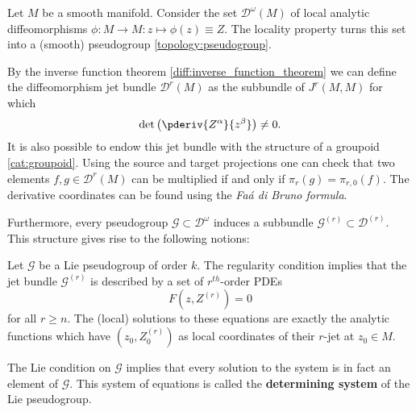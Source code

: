     \begin{example}
        Let $M$ be a smooth manifold. Consider the set $\mathcal{D}^\omega(M)$ of local analytic diffeomorphisms $\phi:M\rightarrow M:z\mapsto\phi(z)\equiv Z$. The locality property turns this set into a (smooth) pseudogroup \ref{topology:pseudogroup}.

        By the inverse function theorem \ref{diff:inverse_function_theorem} we can define the diffeomorphism jet bundle $\mathcal{D}^r(M)$ as the subbundle of $J^r(M,M)$ for which \[\det\left(\pderiv{Z^\alpha}{z^\beta}\right)\neq0.\] It is also possible to endow this jet bundle with the structure of a groupoid \ref{cat:groupoid}. Using the source and target projections one can check that two elements $f,g\in\mathcal{D}^r(M)$ can be multiplied if and only if $\pi_r(g)=\pi_{r,0}(f)$. The derivative coordinates can be found using the \textit{Fa\'a di Bruno formula}.

        Furthermore, every pseudogroup $\mathcal{G}\subset\mathcal{D}^\omega$ induces a subbundle $\mathcal{G}^{(r)}\subset\mathcal{D}^{(r)}$. This structure gives rise to the following notions:
    \end{example}
    \begin{property}
        Let $\mathcal{G}$ be a Lie pseudogroup of order $k$. The regularity condition implies that the jet bundle $\mathcal{G}^{(r)}$ is described by a set of $r^{th}$-order PDEs \[F\left(z, Z^{(r)}\right) = 0\] for all $r\geq n$. The (local) solutions to these equations are exactly the analytic functions which have $(z_0, Z^{(r)}_0)$ as local coordinates of their $r$-jet at $z_0\in M$.

        The Lie condition on $\mathcal{G}$ implies that every solution to the system is in fact an element of $\mathcal{G}$. This system of equations is called the \textbf{determining system} of the Lie pseudogroup.
    \end{property}

